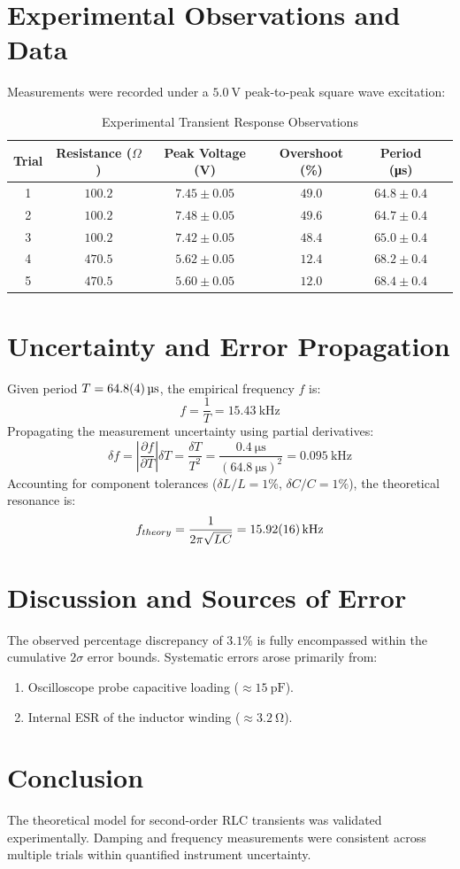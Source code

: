 \documentclass[11pt,a4paper]{article}
\begin{document}
\section{Experimental Observations and Data}
Measurements were recorded under a $\qty{5.0}{\volt}$ peak-to-peak square wave excitation:

\begin{table}[htbp]
\centering
\caption{Experimental Transient Response Observations}
\label{tab:measurements}
\begin{tabular}{cccccc}
\toprule
\textbf{Trial} & \textbf{Resistance ($\Omega$)} & \textbf{Peak Voltage (\unit{\volt})} & \textbf{Overshoot (\%)} & \textbf{Period (\unit{\micro\second})} \\
\midrule
1 & $100.2$ & $7.45 \pm 0.05$ & $49.0$ & $64.8 \pm 0.4$ \\
2 & $100.2$ & $7.48 \pm 0.05$ & $49.6$ & $64.7 \pm 0.4$ \\
3 & $100.2$ & $7.42 \pm 0.05$ & $48.4$ & $65.0 \pm 0.4$ \\
4 & $470.5$ & $5.62 \pm 0.05$ & $12.4$ & $68.2 \pm 0.4$ \\
5 & $470.5$ & $5.60 \pm 0.05$ & $12.0$ & $68.4 \pm 0.4$ \\
\bottomrule
\end{tabular}
\end{table}

\section{Uncertainty and Error Propagation}
Given period $T = \qty{64.8 \pm 0.4}{\micro\second}$, the empirical frequency $f$ is:
\begin{equation}
f = \frac{1}{T} = \qty{15.43}{\kilo\hertz}
\end{equation}
Propagating the measurement uncertainty using partial derivatives:
\begin{equation}
\delta f = \left| \frac{\partial f}{\partial T} \right| \delta T = \frac{\delta T}{T^2} = \frac{\qty{0.4}{\micro\second}}{(\qty{64.8}{\micro\second})^2} = \qty{0.095}{\kilo\hertz}
\end{equation}
Accounting for component tolerances ($\delta L/L = 1\%$, $\delta C/C = 1\%$), the theoretical resonance is:
\begin{equation}
f_{theory} = \frac{1}{2\pi \sqrt{LC}} = \qty{15.92 \pm 0.16}{\kilo\hertz}
\end{equation}

\section{Discussion and Sources of Error}
The observed percentage discrepancy of $3.1\%$ is fully encompassed within the cumulative $2\sigma$ error bounds. Systematic errors arose primarily from:
\begin{enumerate}
    \item Oscilloscope probe capacitive loading ($\approx \qty{15}{\pico\farad}$).
    \item Internal ESR of the inductor winding ($\approx \qty{3.2}{\ohm}$).
\end{enumerate}

\section{Conclusion}
The theoretical model for second-order RLC transients was validated experimentally. Damping and frequency measurements were consistent across multiple trials within quantified instrument uncertainty.
\end{document}
